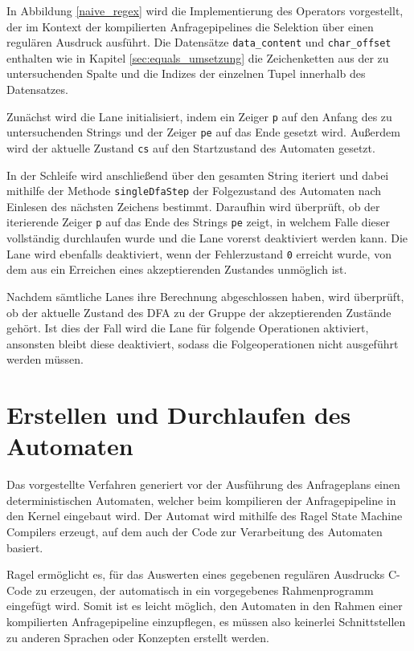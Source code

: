 In Abbildung \ref{naive_regex} wird die Implementierung des Operators vorgestellt, der im Kontext der kompilierten Anfragepipelines die Selektion über einen regulären Ausdruck ausführt.
Die Datensätze \texttt{data\_content} und \texttt{char\_offset} enthalten wie in Kapitel \ref{sec:equals_umsetzung} die Zeichenketten aus der zu untersuchenden Spalte und die Indizes der einzelnen Tupel innerhalb des Datensatzes.

Zunächst wird die Lane initialisiert, indem ein Zeiger \texttt{p} auf den Anfang des zu untersuchenden Strings und der Zeiger \texttt{pe} auf das Ende gesetzt wird.
Außerdem wird der aktuelle Zustand \texttt{cs} auf den Startzustand des Automaten gesetzt.

In der Schleife wird anschließend über den gesamten String iteriert und dabei mithilfe der Methode \texttt{singleDfaStep} der Folgezustand des Automaten nach Einlesen des nächsten Zeichens bestimmt.
Daraufhin wird überprüft, ob der iterierende Zeiger \texttt{p} auf das Ende des Strings \texttt{pe} zeigt, in welchem Falle dieser vollständig durchlaufen wurde und die Lane vorerst deaktiviert werden kann.
Die Lane wird ebenfalls deaktiviert, wenn der Fehlerzustand \texttt{0} erreicht wurde, von dem aus ein Erreichen eines akzeptierenden Zustandes unmöglich ist.

Nachdem sämtliche Lanes ihre Berechnung abgeschlossen haben, wird überprüft, ob der aktuelle Zustand des DFA zu der Gruppe der akzeptierenden Zustände gehört.
Ist dies der Fall wird die Lane für folgende Operationen aktiviert, ansonsten bleibt diese deaktiviert, sodass die Folgeoperationen nicht ausgeführt werden müssen.

\section{Erstellen und Durchlaufen des Automaten}
\label{sec:regex_duchlaufen}

Das vorgestellte Verfahren generiert vor der Ausführung des Anfrageplans einen deterministischen Automaten, welcher beim kompilieren der Anfragepipeline in den Kernel eingebaut wird.
Der Automat wird mithilfe des Ragel State Machine Compilers \cite{Thurston2009} erzeugt, auf dem auch der Code zur Verarbeitung des Automaten basiert.

Ragel ermöglicht es, für das Auswerten eines gegebenen regulären Ausdrucks C-Code zu erzeugen, der automatisch in ein vorgegebenes Rahmenprogramm eingefügt wird.
Somit ist es leicht möglich, den Automaten in den Rahmen einer kompilierten Anfragepipeline einzupflegen, es müssen also keinerlei Schnittstellen zu anderen Sprachen oder Konzepten erstellt werden.

